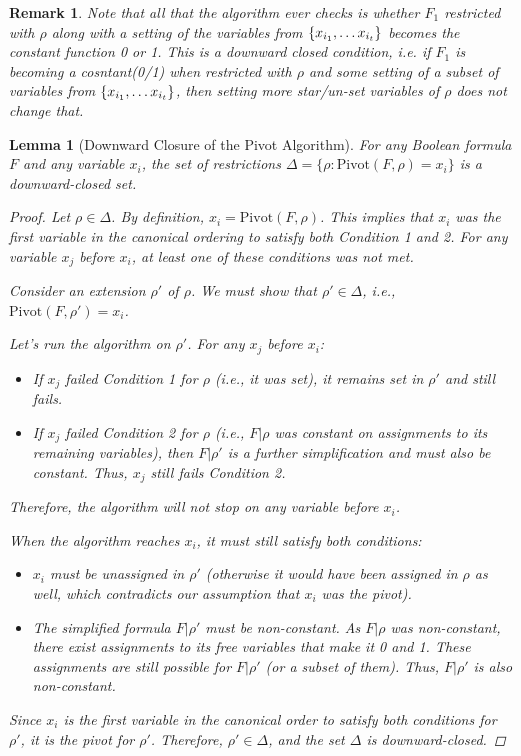 \documentclass[11pt]{article}
\newtheorem{lemma}[theorem]{Lemma}
\newtheorem{remark}[theorem]{Remark}
\begin{document}
\noindent

\begin{remark}
    Note that all that the algorithm ever checks is whether $F_1$ restricted with $\rho$ along with a setting of the variables from $\{x_{i_{1}}, \dots x_{i_{t}}\}$ becomes the constant function 0 or 1. This is a downward closed condition, i.e. if $F_1$ is becoming a cosntant(0/1) when restricted with $\rho$ and some setting of a subset of variables from $\{x_{i_{1}}, \dots x_{i_{t}}\}$, then setting more star/un-set variables of $\rho$ does not change that.
\end{remark}  


\begin{lemma}[Downward Closure of the Pivot Algorithm]
For any Boolean formula $F$ and any variable $x_i$, the set of restrictions $\Delta = \{\rho : \text{Pivot}(F, \rho) = x_i\}$ is a downward-closed set.
\begin{proof}
Let $\rho \in \Delta$. By definition, $x_i = \text{Pivot}(F, \rho)$. This implies that $x_i$ was the first variable in the canonical ordering to satisfy both Condition 1 and 2. For any variable $x_j$ before $x_i$, at least one of these conditions was not met.

Consider an extension $\rho'$ of $\rho$. We must show that $\rho' \in \Delta$, i.e., $\text{Pivot}(F, \rho') = x_i$.

Let's run the algorithm on $\rho'$. For any $x_j$ before $x_i$:
\begin{itemize}
    \item If $x_j$ failed Condition 1 for $\rho$ (i.e., it was set), it remains set in $\rho'$ and still fails.
    \item If $x_j$ failed Condition 2 for $\rho$ (i.e., $F|\rho$ was constant on assignments to its remaining variables), then $F|\rho'$ is a further simplification and must also be constant. Thus, $x_j$ still fails Condition 2.
\end{itemize}
Therefore, the algorithm will not stop on any variable before $x_i$.

When the algorithm reaches $x_i$, it must still satisfy both conditions:
\begin{itemize}
    \item $x_i$ must be unassigned in $\rho'$ (otherwise it would have been assigned in $\rho$ as well, which contradicts our assumption that $x_i$ was the pivot).
    \item The simplified formula $F|\rho'$ must be non-constant. As $F|\rho$ was non-constant, there exist assignments to its free variables that make it 0 and 1. These assignments are still possible for $F|\rho'$ (or a subset of them). Thus, $F|\rho'$ is also non-constant.
\end{itemize}
Since $x_i$ is the first variable in the canonical order to satisfy both conditions for $\rho'$, it is the pivot for $\rho'$. Therefore, $\rho' \in \Delta$, and the set $\Delta$ is downward-closed.
\end{proof}
\end{lemma}
\end{document}
